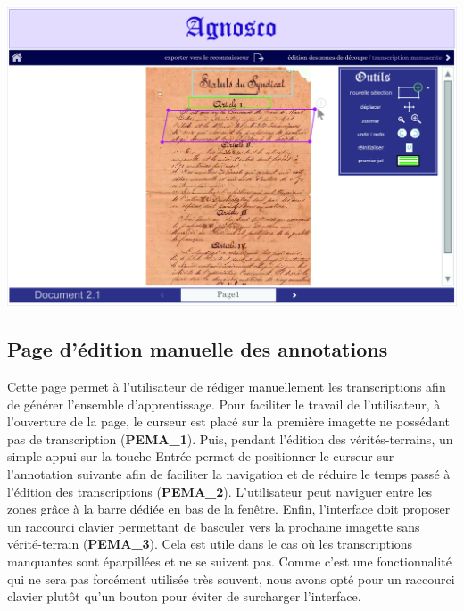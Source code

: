 \begin{mdframed}[frametitle={Figure 7 : Édition des zones de découpe}, innerbottommargin=10]
\begin{center}
\includegraphics[scale=0.05]{ihm2.jpg}
\end{center}
\end{mdframed}

\subsection{Page d'édition manuelle des annotations}

Cette page permet à l’utilisateur de rédiger manuellement les transcriptions
afin de générer l’ensemble d’apprentissage. Pour faciliter le travail de
l’utilisateur, à l’ouverture de la page, le curseur est placé sur la première
imagette ne possédant pas de transcription (\textbf{PEMA\_1}). Puis, pendant
l’édition des vérités-terrains, un simple appui sur la touche Entrée permet de
positionner le curseur sur l’annotation suivante afin de faciliter la
navigation et de réduire le temps passé à l’édition des transcriptions
(\textbf{PEMA\_2}). L’utilisateur peut naviguer entre les zones grâce à 
la barre dédiée en bas de la fenêtre. Enfin, l’interface doit proposer un raccourci clavier
permettant de basculer vers la prochaine imagette sans vérité-terrain
(\textbf{PEMA\_3}). Cela est utile dans le cas où les transcriptions manquantes
sont éparpillées et ne se suivent pas. Comme c’est une fonctionnalité qui ne
sera pas forcément utilisée très souvent, nous avons opté pour un raccourci
clavier plutôt qu’un bouton pour éviter de surcharger l’interface.

